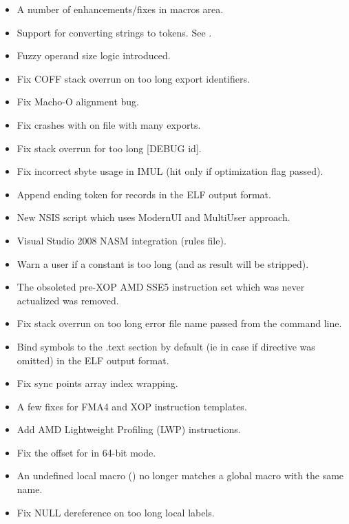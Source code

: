 \begin{itemize}
    \item{A number of enhancements/fixes in macros area.}
    \item{Support for converting strings to tokens. See .}
    \item{Fuzzy operand size logic introduced.}
    \item{Fix COFF stack overrun on too long export identifiers.}
    \item{Fix Macho-O alignment bug.}
    \item{Fix crashes with  on file with many exports.}
    \item{Fix stack overrun for too long [DEBUG id].}
    \item{Fix incorrect sbyte usage in IMUL (hit only if optimization flag passed).}
    \item{Append ending token for  records in the ELF output format.}
    \item{New NSIS script which uses ModernUI and MultiUser approach.}
    \item{Visual Studio 2008 NASM integration (rules file).}
    \item{Warn a user if a constant is too long (and as result will be stripped).}
    \item{The obsoleted pre-XOP AMD SSE5 instruction set which was never actualized was removed.}
    \item{Fix stack overrun on too long error file name passed from the command line.}
    \item{Bind symbols to the .text section by default (ie in case if
         directive was omitted) in the ELF output format.}
    \item{Fix sync points array index wrapping.}
    \item{A few fixes for FMA4 and XOP instruction templates.}
    \item{Add AMD Lightweight Profiling (LWP) instructions.}
    \item{Fix the offset for  in 64-bit mode.}
    \item{An undefined local macro (\code{\%\$}) no longer matches a global macro
            with the same name.}
        \item{Fix NULL dereference on too long local labels.}
\end{itemize}


